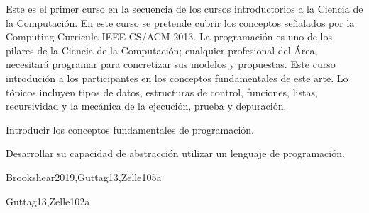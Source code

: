 \begin{syllabus}

\begin{justification}
Este es el primer curso en la secuencia de los cursos introductorios a la Ciencia de la Computación. 
En este curso se pretende cubrir los conceptos señalados por la Computing Curricula IEEE-CS/ACM 2013.
La programación es uno de los pilares de la Ciencia de la Computación; cualquier profesional del Área, necesitará programar para concretizar sus modelos y propuestas.
Este curso introdución a los participantes en los conceptos fundamentales de este arte. 
Lo tópicos incluyen tipos de datos, estructuras de control, funciones, listas, recursividad y la mecánica de la ejecución, prueba y depuración.
\end{justification}

\begin{goals}
\item Introducir los conceptos fundamentales de programación.
\item Desarrollar su capacidad de abstracción utilizar un lenguaje de programación.
\end{goals}



\begin{unit}{\SPHistory}{}{Brookshear2019,Guttag13,Zelle10}{5}{a}
    \begin{topics}
        \item \SPHistoryTopicPrehistory
        \item \SPHistoryTopicHistory
        \item \SPHistoryTopicPioneers
        \item \SPHistoryTopicHistoryOf
    \end{topics}
    
    \begin{learningoutcomes}
        \item \SPHistoryLOIdentifySignificant [\Familiarity]
        \item \SPHistoryLOIdentifyTheSeveral [\Familiarity]
        \item \SPHistoryLODiscussTheForLanguage [\Familiarity]
        \item \SPHistoryLOCompareDaily [\Assessment] 
    \end{learningoutcomes}
\end{unit}

\begin{unit}{\PLBasicTypeSystems}{}{Guttag13,Zelle10}{2}{a}
    \begin{topics}
        \item \PLBasicTypeSystemsTopicA
        \item \PLBasicTypeSystemsTopicAssociation
		\item \PLBasicTypeSystemsTopicType
    \end{topics}


\end{unit}
\end{syllabus}
